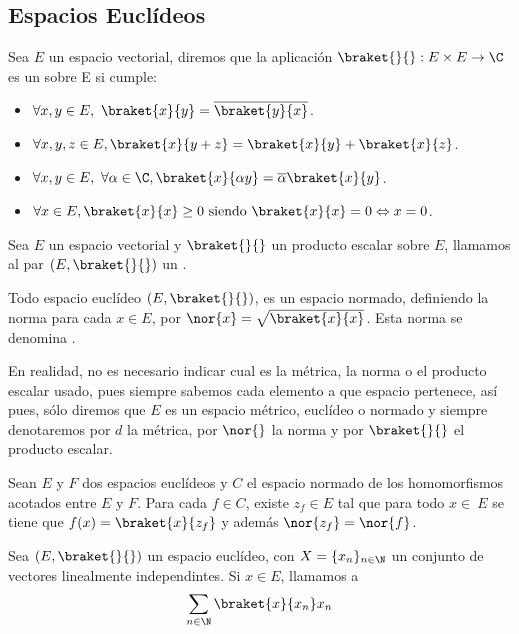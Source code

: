 \subsection{Espacios Euclídeos}
\begin{definition}
  \label{producto_escalar}
  Sea $E$ un espacio vectorial, diremos que la aplicación $\braket{}{}:E\times E \rightarrow \C$ es un  sobre E si cumple:
  \begin{itemize}
    \item $\forall x,y \in E,\ \braket{x}{y}=\overline{\braket{y}{x}}$.
    \item $\forall x,y,z \in E, \braket{x}{y+z}=\braket{x}{y}+\braket{x}{z}$.
    \item $\forall x,y \in E,\ \forall\alpha\in\C, \braket{x}{\alpha y}=\overline{\alpha}\braket{x}{y}$.
    \item $\forall x \in E, \braket{x}{x}\geq 0 \text{ siendo } \braket{x}{x}=0\Leftrightarrow x = 0$.
  \end{itemize}
\end{definition}

\begin{definition}
  \label{espacio_euclideo}
  Sea $E$ un espacio vectorial y $\braket{}{}$ un producto escalar sobre $E$, llamamos al par $(E, \braket{}{})$ un .
\end{definition}

Todo espacio euclídeo $(E, \braket{}{})$, es un espacio normado, definiendo la norma para cada $x\in E$, por $\nor{x}=\sqrt{\braket{x}{x}}$. Esta norma se denomina .

En realidad, no es necesario indicar cual es la métrica, la norma o el producto escalar usado, pues siempre sabemos cada elemento a que espacio pertenece, así pues, sólo diremos que $E$ es un espacio métrico, euclídeo o normado y siempre denotaremos por $d$ la métrica, por $\nor{}$ la norma y por $\braket{}{}$ el producto escalar.

\begin{proposition}[Riesz]
  Sean $E$ y $F$ dos espacios euclídeos y $C$ el espacio normado de los homomorfismos acotados entre $E$ y $F$. Para cada $f\in C$, existe $z_f\in E$ tal que para todo $x\in\ E$ se tiene que $f(x)=\braket{x}{z_f}$ y además $\nor{z_f}=\nor{f}$.
\end{proposition}

\begin{definition}
  Sea $(E, \braket{}{})$ un espacio euclídeo, con $X=\{x_n\}_{n\in\N}$ un conjunto de vectores linealmente independintes. Si $x\in E$, llamamos  a
  \begin{equation}
    \sum_{n\in\N}\braket{x}{x_n}x_n
  \end{equation}
\end{definition}

